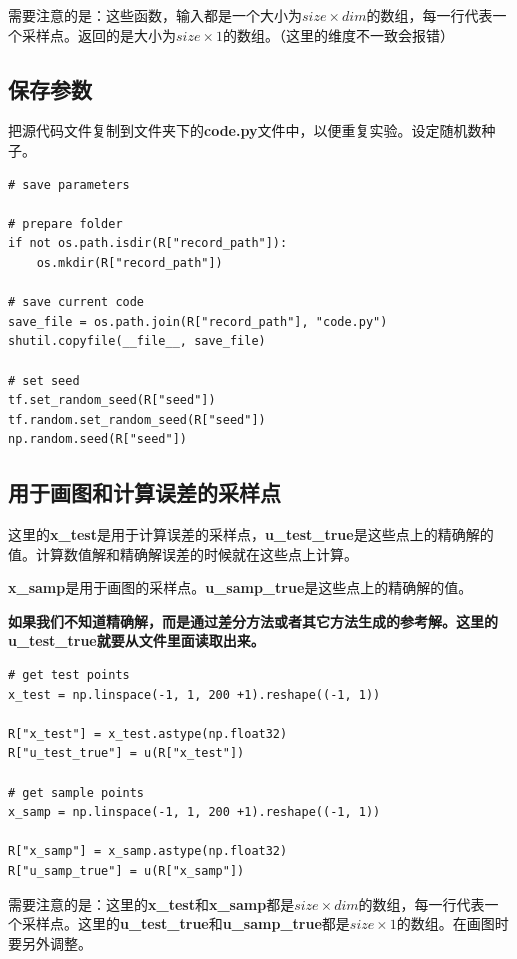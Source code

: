 \documentclass[12pt,a4paper]{article}
\begin{document}
需要注意的是：这些函数，输入都是一个大小为$size \times dim$的数组，每一行代表一个采样点。返回的是大小为$size \times 1$的数组。（这里的维度不一致会报错）

\subsection*{保存参数}

把源代码文件复制到文件夹下的\textbf{code.py}文件中，以便重复实验。设定随机数种子。

\begin{lstlisting}
# save parameters

# prepare folder
if not os.path.isdir(R["record_path"]):
    os.mkdir(R["record_path"])

# save current code
save_file = os.path.join(R["record_path"], "code.py")
shutil.copyfile(__file__, save_file)

# set seed
tf.set_random_seed(R["seed"])
tf.random.set_random_seed(R["seed"])
np.random.seed(R["seed"])
\end{lstlisting}

\subsection*{用于画图和计算误差的采样点}

这里的\textbf{x\_test}是用于计算误差的采样点，\textbf{u\_test\_true}是这些点上的精确解的值。计算数值解和精确解误差的时候就在这些点上计算。

\textbf{x\_samp}是用于画图的采样点。\textbf{u\_samp\_true}是这些点上的精确解的值。

\textbf{如果我们不知道精确解，而是通过差分方法或者其它方法生成的参考解。这里的\textbf{u\_test\_true}就要从文件里面读取出来。}

\begin{lstlisting}
# get test points
x_test = np.linspace(-1, 1, 200 +1).reshape((-1, 1))

R["x_test"] = x_test.astype(np.float32)
R["u_test_true"] = u(R["x_test"])

# get sample points
x_samp = np.linspace(-1, 1, 200 +1).reshape((-1, 1))

R["x_samp"] = x_samp.astype(np.float32)
R["u_samp_true"] = u(R["x_samp"])
\end{lstlisting}

需要注意的是：这里的\textbf{x\_test}和\textbf{x\_samp}都是$size \times dim$的数组，每一行代表一个采样点。这里的\textbf{u\_test\_true}和\textbf{u\_samp\_true}都是$size \times 1$的数组。在画图时要另外调整。
\end{document}
